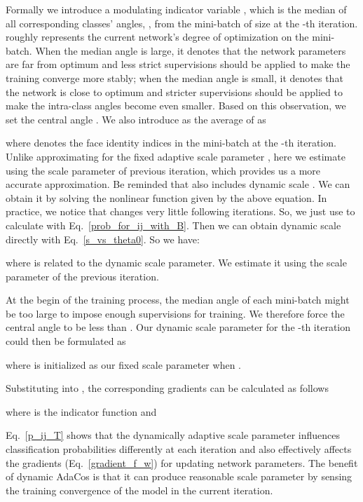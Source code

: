 \documentclass[10pt,twocolumn,letterpaper]{article}
\begin{document}
Formally we introduce a modulating indicator variable , which is the median of all corresponding classes' angles, , from the mini-batch of size  at the -th iteration.  roughly represents the current network's degree of optimization on the mini-batch. When the median angle is large, it denotes that the network parameters are far from optimum and less strict supervisions should be applied to make the training converge more stably;  when the median angle  is small, it denotes that the network is close to optimum and stricter supervisions should be applied to make the intra-class angles  become even smaller. Based on this observation, we set the central angle . We also introduce  as the average of  as 

where  denotes the face identity indices in the mini-batch at the -th iteration. Unlike approximating  for the fixed adaptive scale parameter , here we estimate  using the scale parameter  of previous iteration, which provides us a more accurate approximation. 
Be reminded that  also includes dynamic scale  . We can obtain it by solving the nonlinear function given by the above equation. In practice, we notice that  changes very little following iterations. So, we just use  to calculate   with Eq.~\eqref{prob_for_ij_with_B}. Then we can obtain dynamic scale  directly with Eq.~\eqref{s_vs_theta0}. So we have:

where  is related to the dynamic scale parameter. We estimate it using the scale parameter  of the previous iteration.

At the begin of the training process, the median angle  of each mini-batch might be too large to impose enough supervisions for training. We therefore force the central angle  to be less than .
Our dynamic scale parameter for the -th iteration could then be formulated as

where  is initialized as our fixed scale parameter  when . 

 
Substituting  into , the corresponding gradients can be calculated as follows

where  is the indicator function and

Eq.~\eqref{p_ij_T} shows that the dynamically adaptive scale parameter  influences classification probabilities differently at each iteration and also effectively affects the gradients (Eq.~\eqref{gradient_f_w}) for updating network parameters. The benefit of dynamic AdaCos is that it can produce reasonable scale parameter by sensing the training convergence of the model in the current iteration.
\end{document}
